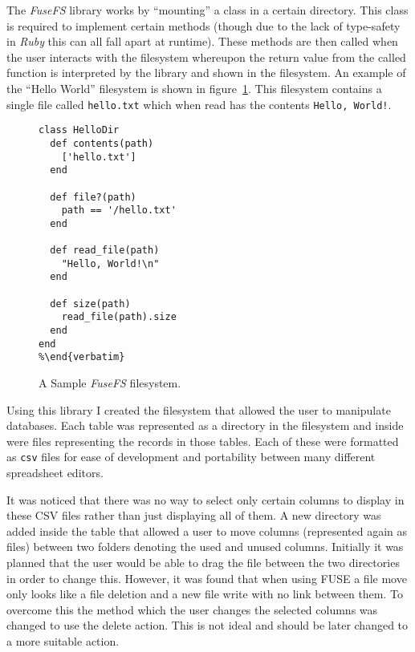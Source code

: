 The \emph{FuseFS} library works by ``mounting'' a class in a certain directory.
This class is required to implement certain methods (though due to the lack of
type-safety in \emph{Ruby} this can all fall apart at runtime). These methods
are then called when the user interacts with the filesystem whereupon the
return value from the called function is interpreted by the library and shown
in the filesystem. An example of the ``Hello World'' filesystem is shown in
figure~\ref{fig:fusefs}. This filesystem contains a single file called
\texttt{hello.txt} which when read has the contents \texttt{Hello, World!}.

\begin{figure}
\begin{lstlisting}
class HelloDir
  def contents(path)
    ['hello.txt']
  end

  def file?(path)
    path == '/hello.txt'
  end

  def read_file(path)
    "Hello, World!\n"
  end

  def size(path)
    read_file(path).size
  end
end
%\end{verbatim}
\end{lstlisting}
  \caption{A Sample \emph{FuseFS} filesystem.}
  \label{fig:fusefs}
\end{figure}

Using this library I created the filesystem that allowed the user to manipulate
databases. Each table was represented as a directory in the filesystem and
inside were files representing the records in those tables. Each of these were
formatted as \texttt{csv} files for ease of development and portability between
many different spreadsheet editors.

It was noticed that there was no way to select only certain columns to display
in these CSV files rather than just displaying all of them. A new directory was
added inside the table that allowed a user to move columns (represented again
as files) between two folders denoting the used and unused columns. Initially
it was planned that the user would be able to drag the file between the two
directories in order to change this. However, it was found that when using
\ac{FUSE} a file move only looks like a file deletion and a new file write with
no link between them. To overcome this the method which the user changes the
selected columns was changed to use the delete action. This is not ideal and
should be later changed to a more suitable action.

